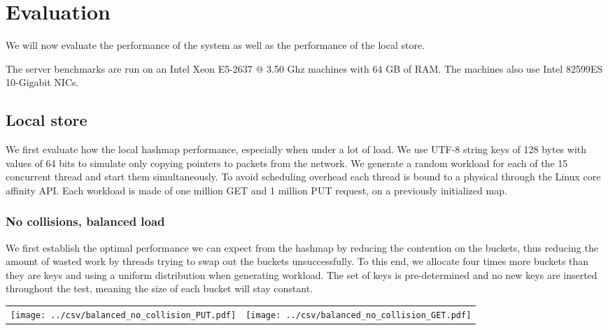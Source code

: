 \documentclass[11pt]{book}
\newcommand{\marios}[1]{\noindent{{\bf \fbox{MK:} {\textcolor{green}{\it#1}}}}}
\begin{document}
\chapter{Evaluation}
\label{chap:evaluation}

We will now evaluate the performance of the system as well as the
performance of the local store.

The server benchmarks are run on an Intel Xeon E5-2637 @ 3.50 Ghz
machines with 64 GB of RAM\@. The machines also use Intel 82599ES
10-Gigabit NICs.
\marios{Add more details about the setup. Linux and DPDK version, Rust version etc.}

\section{Local store}
\label{sec:eval-local}

We first evaluate how the local hashmap performance, especially when
under a lot of load. We use UTF-8 string keys of 128 bytes with values
of 64 bits to simulate only copying pointers to packets from the
network. We generate a random workload for each of the 15 concurrent
thread and start them simultaneously. To avoid scheduling overhead
each thread is bound to a physical through the Linux core affinity
API\@. Each workload is made of one million GET and 1 million PUT
request, on a previously initialized map.

\subsection{No collisions, balanced load}

We first establish the optimal performance we can expect from the
hashmap by reducing the contention on the buckets, thus reducing the
amount of wasted work by threads trying to swap out the buckets
unsuccessfully. To this end, we allocate four times more buckets than
they are keys and using a uniform distribution when generating
workload. The set of keys is pre-determined and no new keys are
inserted throughout the test, meaning the size of each bucket will
stay constant.

\begin{center}
  \begin{tabular}{c c} \label{table:nocol-balanced}
    \texttt{[image: ../csv/balanced\_no\_collision\_PUT.pdf]}
    &
      \texttt{[image: ../csv/balanced\_no\_collision\_GET.pdf]}
  \end{tabular}
\end{center}
\end{document}
